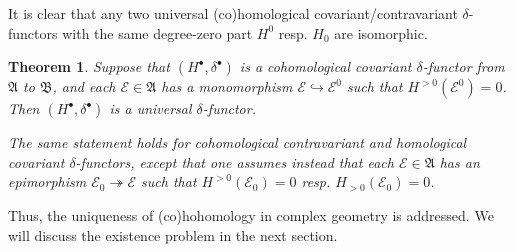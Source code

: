 \documentclass[12pt,b5paper,notitlepage]{report}
\theoremstyle{definition}
\theoremstyle{plain}
\newtheorem{thm}[df]{Theorem}
\newcommand{\fk}{\mathfrak}
\newcommand{\mc}{\mathcal}
\newcommand{\blt}{\bullet}
\numberwithin{equation}{section}
\begin{document}
It is clear that any two universal (co)homological covariant/contravariant $\delta$-functors with the same degree-zero part $H^0$ resp. $H_0$ are isomorphic.
















\begin{thm}\label{lb252}
Suppose that $(H^\blt,\delta^\blt)$ is a cohomological covariant $\delta$-functor from $\fk A$ to $\fk B$, and each $\mc E\in\fk A$ has a monomorphism $\mc E\hookrightarrow\mc E^0$ such that $H^{>0}(\mc E^0)=0$. Then $(H^\blt,\delta^\blt)$ is a universal $\delta$-functor.


The same statement holds for cohomological contravariant and homological covariant $\delta$-functors, except that one assumes instead that each $\mc E\in\fk A$ has an epimorphism $\mc E_0\twoheadrightarrow\mc E$ such that $H^{>0}(\mc E_0)=0$ resp. $H_{>0}(\mc E_0)=0$.
\end{thm}

Thus, the uniqueness of (co)hohomology in complex geometry is addressed. We will discuss the existence problem in the next section.
\end{document}

